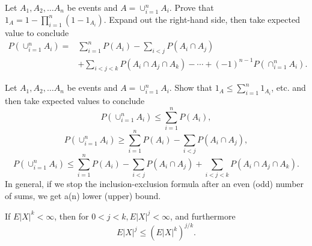 \documentclass[en, normal, 11pt, black]{elegantnote}
\newenvironment{exercise}[1]{\begin{tcolorbox}[colback=black!15, colframe=black!80, breakable, title=#1]}{\end{tcolorbox}}
\begin{document}
    \begin{exercise}{1.6.9. Inclusion-exclusion formula.}
        Let $A_{1}, A_{2}, \ldots A_{n}$ be events and $A=\cup_{i=1}^{n} A_{i}$. Prove that $1_{A}=1-\prod_{i=1}^{n}\left(1-1_{A_{i}}\right)$. Expand out the right-hand side, then take expected value to conclude
        \begin{align*}
            P\left(\cup_{i=1}^{n} A_{i}\right)=& \sum_{i=1}^{n} P\left(A_{i}\right)-\sum_{i<j} P\left(A_{i} \cap A_{j}\right) \\
            &+\sum_{i<j<k} P\left(A_{i} \cap A_{j} \cap A_{k}\right)-\cdots+(-1)^{n-1} P\left(\cap_{i=1}^{n} A_{i}\right). 
        \end{align*}
    \end{exercise}


    \begin{exercise}{1.6.10. Bonferroni inequalities.}
        Let $A_{1}, A_{2}, \ldots A_{n}$ be events and $A=\cup_{i=1}^{n} A_{i} .$ Show that $1_{A} \leq \sum_{i=1}^{n} 1_{A_{i}}$, etc. and then take expected values to conclude
        \[
            P\left(\cup_{i=1}^{n} A_{i}\right) \leq \sum_{i=1}^{n} P\left(A_{i}\right), 
        \]
        \[
            P\left(\cup_{i=1}^{n} A_{i}\right) \geq \sum_{i=1}^{n} P\left(A_{i}\right)-\sum_{i<j} P\left(A_{i} \cap A_{j}\right), 
        \]
        \[
            P\left(\cup_{i=1}^{n} A_{i}\right) \leq \sum_{i=1}^{n} P\left(A_{i}\right)-\sum_{i<j} P\left(A_{i} \cap A_{j}\right)+\sum_{i<j<k} P\left(A_{i} \cap A_{j} \cap A_{k}\right). 
        \]
        In general, if we stop the inclusion-exclusion formula after an even (odd) number of sums, we get a(n) lower (upper) bound. 
    \end{exercise}


    \begin{exercise}{1.6.11.}
        If $E|X|^{k}<\infty$, then for $0<j<k, E|X|^{j}<\infty$, and furthermore 
        \[
            E|X|^{j} \leq\left(E|X|^{k}\right)^{j / k}. 
        \]
    \end{exercise}
\end{document}
